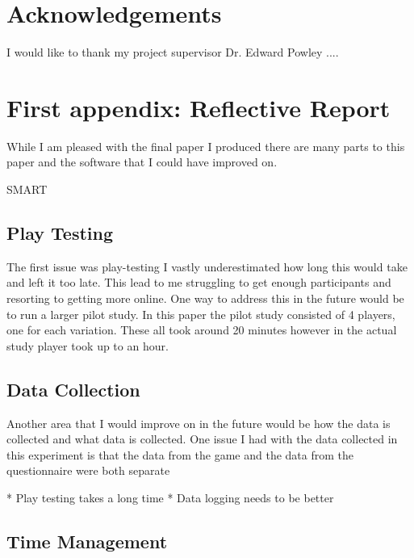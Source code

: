\documentclass[journal]{IEEEtran}
\begin{document}
	\appendices
	\section{Acknowledgements}
	I would like to thank my project supervisor Dr. Edward Powley ....
	
	\section{First appendix: Reflective Report}
	While I am pleased with the final paper I produced there are many parts to this paper and the software that I could have improved on. 
	
	SMART
	
	\subsection{Play Testing}
	The first issue was play-testing I vastly underestimated how long this would take and left it too late. This lead to me struggling to get enough participants and resorting to getting more online. One way to address this in the future would be to run a larger pilot study. In this paper the pilot study consisted of 4 players, one for each variation. These all took around 20 minutes however in the actual study player took up to an hour. 
	
	\subsection{Data Collection}
	Another area that I would improve on in the future would be how the data is collected and what data is collected. One issue I had with the data collected in this experiment is that the data from the game and the data from the questionnaire were both separate 
	
	    * Play testing takes a long time
	    * Data logging needs to be better 
	
	\subsection{Time Management}
	
	
\end{document}
